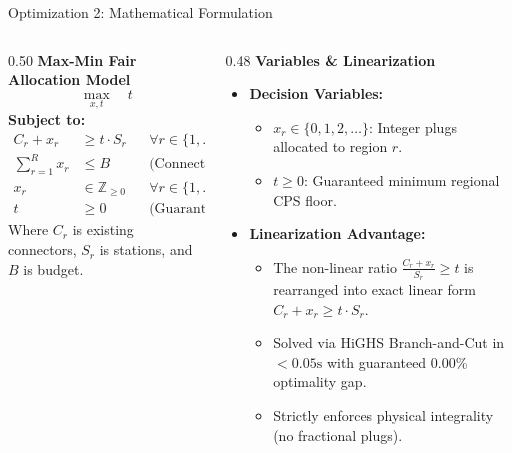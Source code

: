 \documentclass[aspectratio=169,10pt]{beamer}
\begin{document}
\begin{frame}{Optimization 2: Mathematical Formulation}
  \vspace{0.15cm}
  \begin{columns}[T]
    \begin{column}{0.50\textwidth}
      \textbf{\color{Navy}Max-Min Fair Allocation Model}
      $$\max_{x, t} \quad t$$
      \textbf{Subject to:}
      \begin{align*}
        C_r + x_r &\ge t \cdot S_r && \forall r \in \{1,\dots,R\} \\
        \sum_{r=1}^{R} x_r &\le B && \text{(Connector Budget)} \\
        x_r &\in \mathbb{Z}_{\ge 0} && \forall r \in \{1,\dots,R\} \\
        t &\ge 0 && \text{(Guaranteed Floor)}
      \end{align*}
      {\scriptsize Where $C_r$ is existing connectors, $S_r$ is stations, and $B$ is budget.}
    \end{column}
    \begin{column}{0.48\textwidth}
      \textbf{\color{Blue}Variables \& Linearization}
      \begin{itemize}\setlength{\itemsep}{0.15cm}
        \item \textbf{Decision Variables:}
          \begin{itemize}\setlength{\itemsep}{0.08cm}
            \item $x_r \in \{0, 1, 2,\dots\}$: Integer plugs allocated to region $r$.
            \item $t \ge 0$: Guaranteed minimum regional CPS floor.
          \end{itemize}
        \item \textbf{Linearization Advantage:}
          \begin{itemize}\setlength{\itemsep}{0.08cm}
            \item The non-linear ratio $\frac{C_r + x_r}{S_r} \ge t$ is rearranged into exact linear form $C_r + x_r \ge t \cdot S_r$.
            \item Solved via HiGHS Branch-and-Cut in $<0.05\text{s}$ with guaranteed 0.00\% optimality gap.
            \item Strictly enforces physical integrality (no fractional plugs).
          \end{itemize}
      \end{itemize}
    \end{column}
  \end{columns}
\end{frame}
\end{document}
